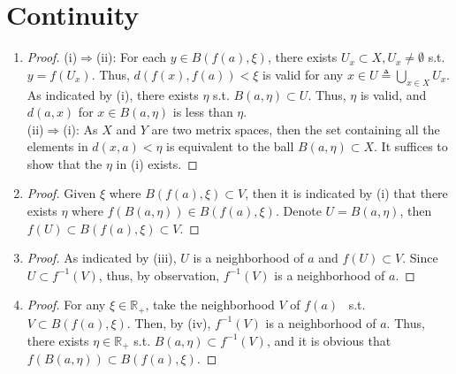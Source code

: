 \documentclass[paper=a4, fontsize=11pt]{scrartcl} %
\numberwithin{equation}{section} %
\numberwithin{figure}{section} %
\numberwithin{table}{section} %
\begin{document}

\section{Continuity}
	\begin{enumerate}
		\item
			\begin{proof}
				(i)$\Rightarrow$(ii): For each $ y \in B(f(a), \xi)$, there exists $U_x \subset X, U_x \neq \emptyset$ s.t. $y = f(U_x)$. Thus, $d(f(x), f(a)) < \xi$ is valid for any $x \in U \triangleq \bigcup\limits_{x \in X} U_x$. As indicated by (i), there exists $\eta$ s.t. $B(a, \eta) \subset U$. Thus, $\eta$ is valid, and $d(a, x)$ for $x \in B(a, \eta)$ is less than $\eta$.\\
				(ii)$\Rightarrow$(i): As $X$ and $Y$ are two metrix spaces, then the set containing all the elements in $d(x, a) < \eta$ is equivalent to the ball $B(a, \eta) \subset X$. It suffices to show that the $\eta$ in (i) exists.
			\end{proof}
		\item
			\begin{proof}
				Given $\xi$ where $B(f(a), \xi) \subset V$, then it is indicated by (i) that there exists $\eta$ where $f(B(a, \eta)) \in B(f(a), \xi)$. Denote $U = B(a, \eta)$, then $f(U) \subset B(f(a), \xi) \subset V$.
			\end{proof}
		\item
			\begin{proof}
				As indicated by (iii), $U$ is a neighborhood of $a$ and $f(U) \subset V$. Since $U \subset f^{-1}(V)$, thus, by observation, $f^{-1}(V)$ is a neighborhood of $a$. 
			\end{proof}
		\item
			\begin{proof}
				For any $\xi \in \mathbb{R}_+$, take the neighborhood $V$ of $f(a)$ \ s.t. $V \subset B(f(a), \xi)$. Then, by (iv), $f^{-1}(V)$ is a neighborhood of $a$. Thus, there exists $\eta \in \mathbb{R}_+$ s.t. $B(a, \eta) \subset f^{-1}(V)$, and it is obvious that $f(B(a, \eta)) \subset B(f(a), \xi)$.
			\end{proof}
	\end{enumerate}
\end{document}
